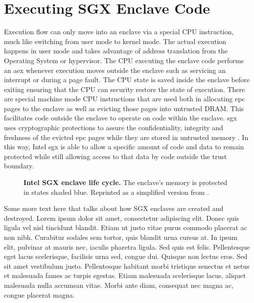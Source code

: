 \section{Executing SGX Enclave Code}
Execution flow can only move into an enclave via a special CPU instruction, much like switching from user mode to kernel mode. The actual execution happens in user mode and takes advantage of address translation from the Operating System or hypervisor. The CPU executing the enclave code performs an \gls{aex} whenever execution moves outside the enclave such as servicing an interrupt or during a page fault. The CPU state is saved inside the enclave before exiting ensuring that the CPU can security restore the state of execution. There are special machine mode CPU instructions that are used both in allocating \gls{epc} pages to the enclave as well as evicting those pages into untrusted DRAM. This facilitates code outside the enclave to operate on code within the enclave. \gls{sgx} uses cryptographic protections to assure the confidentiality, integrity and freshness of the evicted \gls{epc} pages while they are stored in untrusted memory \cite{intel-sgx-explained}. In this way, Intel \gls{sgx} is able to allow a specific amount of code and data to remain protected while still allowing access to that data by code outside the trust boundary.

\begin{figure}[h]
\makebox[\textwidth][c]{
}\caption[Intel SGX Enclave Lifecycle]{\textbf{Intel SGX enclave life cycle.} The enclave's memory is protected in states shaded blue. Reprinted as a simplified version from \cite{intel-sgx-explained}.\label{figure:sgx-enclave-life-cycle}}
\end{figure}

Some more text here that talks about how SGX enclaves are created and destroyed. Lorem ipsum dolor sit amet, consectetur adipiscing elit. Donec quis ligula vel nisl tincidunt blandit. Etiam ut justo vitae purus commodo placerat ac non nibh. Curabitur sodales sem tortor, quis blandit urna cursus at. In ipsum elit, pulvinar at mauris nec, iaculis pharetra ligula. Sed quis est felis. Pellentesque eget lacus scelerisque, facilisis urna sed, congue dui. Quisque non lectus eros. Sed sit amet vestibulum justo. Pellentesque habitant morbi tristique senectus et netus et malesuada fames ac turpis egestas. Etiam malesuada scelerisque lacus, aliquet malesuada nulla accumsan vitae. Morbi ante diam, consequat nec magna ac, congue placerat magna.

